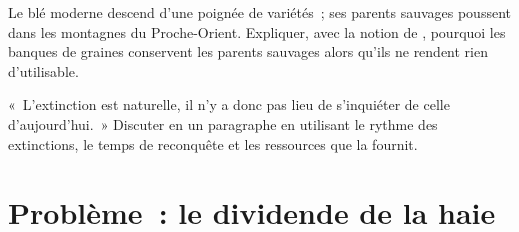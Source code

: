 \begin{exercise}[$\star\star\star$]\label{exo:g10:biodiversity-scales:14}
Le blé moderne descend d'une poignée de variétés~; ses parents
sauvages poussent dans les montagnes du Proche-Orient. Expliquer, avec
la notion de , pourquoi les banques de graines
conservent les parents sauvages alors qu'ils ne rendent rien
d'utilisable.
\end{exercise}

\begin{exercise}[$\star\star\star$]\label{exo:g10:biodiversity-scales:15}
«~L'extinction est naturelle, il n'y a donc pas lieu de s'inquiéter de
celle d'aujourd'hui.~» Discuter en un paragraphe en utilisant le
rythme des extinctions, le temps de reconquête et les ressources que
la  fournit.
\end{exercise}

\section{Problème~: le dividende de la haie}

